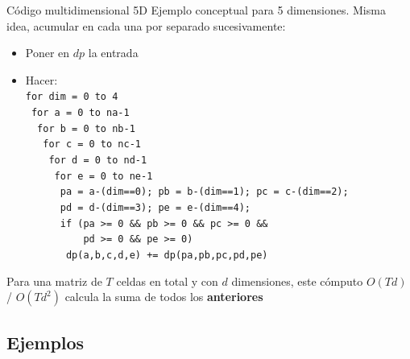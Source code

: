 \documentclass{beamer}
\begin{document}
\begin{frame}{Código multidimensional 5D}
    Ejemplo conceptual para 5 dimensiones. Misma idea, acumular en cada una por separado sucesivamente:
    \begin{itemize}
		\item Poner en $dp$ la entrada
        \item Hacer:\\
        \footnotesize
        \texttt{for dim = 0 to 4}\\
        \texttt{\ for a = 0 to na-1}\\
        \texttt{\ \ for b = 0 to nb-1}\\
        \texttt{\ \ \ for c = 0 to nc-1}\\
        \texttt{\ \ \ \ for d = 0 to nd-1}\\
        \texttt{\ \ \ \ \ for e = 0 to ne-1}\\
        \texttt{\ \ \ \ \ \ pa = a-(dim==0); pb = b-(dim==1); pc = c-(dim==2);}\\
        \texttt{\ \ \ \ \ \ pd = d-(dim==3); pe = e-(dim==4);}\\
        \texttt{\ \ \ \ \ \ if (pa >= 0 \&\& pb >= 0 \&\& pc >= 0 \&\&}\\
        \texttt{\ \ \ \ \ \ \ \ \ \ pd >= 0 \&\& pe >= 0)}\\
        \texttt{\ \ \ \ \ \ \ dp(a,b,c,d,e) += dp(pa,pb,pc,pd,pe)}\\
    \end{itemize}
    Para una matriz de $T$ celdas en total y con $d$ dimensiones, este cómputo $O(T d)$ / $O(T d^2)$ calcula la suma de todos los \textbf{anteriores}
    
    
\end{frame}


\subsection{Ejemplos}
\end{document}
